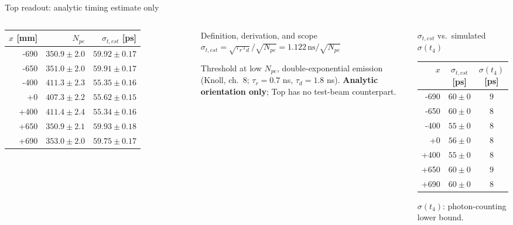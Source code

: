 \documentclass[aspectratio=169]{beamer}
\begin{document}
\begin{frame}{Top readout: analytic timing estimate only}

\begin{columns}[T]
\scriptsize\setlength{\tabcolsep}{4pt}
\begin{tabular}{rrr}\toprule
$x$ [mm] & $N_{pe}$ & $\sigma_{t,est}$ [ps] \\ \midrule
-690 & $350.9\pm2.0$ & $59.92\pm0.17$ \\
-650 & $351.0\pm2.0$ & $59.91\pm0.17$ \\
-400 & $411.3\pm2.3$ & $55.35\pm0.16$ \\
+0 & $407.3\pm2.2$ & $55.62\pm0.15$ \\
+400 & $411.4\pm2.4$ & $55.34\pm0.16$ \\
+650 & $350.9\pm2.1$ & $59.93\pm0.18$ \\
+690 & $353.0\pm2.0$ & $59.75\pm0.17$ \\
\bottomrule\end{tabular}
\begin{block}{\footnotesize Definition, derivation, and scope}
\scriptsize $\sigma_{t,est}=\sqrt{\tau_r\tau_d}/\sqrt{N_{pe}}
=1.122\,\mathrm{ns}/\sqrt{N_{pe}}$
\par Threshold at low $N_{pe}$, double-exponential emission
(Knoll, ch.\ 8; $\tau_r=0.7$ ns, $\tau_d=1.8$ ns).
\textbf{Analytic orientation only}; Top has no test-beam counterpart.
\end{block}
\begin{block}{\footnotesize $\sigma_{t,est}$ vs.\ simulated $\sigma(t_4)$}
\tiny\setlength{\tabcolsep}{3pt}\begin{tabular}{rcc}\toprule
$x$ & $\sigma_{t,est}$ [ps] & $\sigma(t_4)$ [ps]\\ \midrule
-690 & $60\pm0$ & $9$ \\
-650 & $60\pm0$ & $8$ \\
-400 & $55\pm0$ & $8$ \\
+0 & $56\pm0$ & $8$ \\
+400 & $55\pm0$ & $8$ \\
+650 & $60\pm0$ & $9$ \\
+690 & $60\pm0$ & $8$ \\
\bottomrule\end{tabular}
\par\tiny $\sigma(t_4)$: photon-counting lower bound.
\end{block}
\end{columns}

\end{frame}
\end{document}
